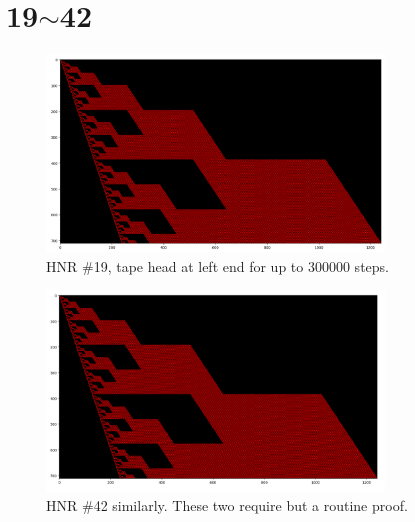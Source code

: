 \documentclass[12pt]{article}
\begin{document}
\newpage

\section*{19$\sim$42}

\begin{figure}[H]
\centering
\includegraphics[width=0.8\textwidth]{19.png}
\caption{HNR \#19, tape head at left end for up to 300000 steps.}
\end{figure}

\begin{figure}[H]
\centering
\includegraphics[width=0.8\textwidth]{42.png}
\caption{HNR \#42 similarly. These two require but a routine proof.}
\end{figure}


\end{document}
